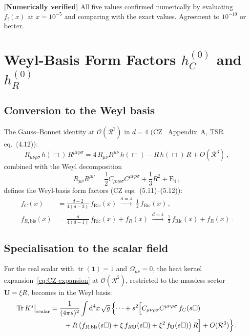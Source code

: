 \documentclass[11pt,a4paper]{article}
\newcommand{\Id}{\mathbf{1}}
\newcommand{\Tr}{\operatorname{Tr}}
\newcommand{\tr}{\operatorname{tr}}
\newcommand{\Ricsq}{R_{\mu\nu}R^{\mu\nu}}
\newcommand{\Weylsq}{C_{\mu\nu\rho\sigma}C^{\mu\nu\rho\sigma}}
\newcommand{\dd}{\mathrm{d}}
\theoremstyle{definition}
\theoremstyle{remark}
\newcommand{\verified}[1]{%
  \par\noindent\colorbox{green!10}{%
    \parbox{\dimexpr\linewidth-2\fboxsep}{%
      \textcolor{green!50!black}{\textbf{[Numerically verified]}}
      \textcolor{green!50!black}{#1}%
    }%
  }\par%
}
\begin{document}
\verified{All five values confirmed numerically by evaluating
$f_i(x)$ at $x = 10^{-5}$ and comparing with the exact values.
Agreement to $10^{-10}$ or better.}


\section{Weyl-Basis Form Factors $h_C^{(0)}$ and $h_R^{(0)}$}
\label{sec:weyl}

\subsection{Conversion to the Weyl basis}

The Gauss--Bonnet identity at $\mathcal{O}(\mathcal{R}^2)$ in $d=4$
(CZ~\cite{CZ2012} Appendix~A, TSR~\cite{TSR2020} eq.~(4.12)):
\begin{equation}
  R_{\mu\nu\rho\sigma}\,h(\Box)\,R^{\mu\nu\rho\sigma}
  = 4\,\Ricsq\,h(\Box) - R\,h(\Box)\,R + O(\mathcal{R}^3)\,,
  \label{eq:GB}
\end{equation}
combined with the Weyl decomposition
\begin{equation}
  \Ricsq = \frac{1}{2}\Weylsq + \frac{1}{3}R^2 + \text{E}_4\,,
  \label{eq:weyl-decomp}
\end{equation}
defines the Weyl-basis form factors (CZ eqs.~(5.11)--(5.12)):
\begin{align}
  f_C(x) &= \frac{d-2}{4(d-3)}\,f_{\text{Ric}}(x)
    \;\xrightarrow{d=4}\;
    \frac{1}{2}\,f_{\text{Ric}}(x)\,,
  \label{eq:fC}\\[4pt]
  f_{R,\text{bis}}(x) &= \frac{d}{4(d-1)}\,f_{\text{Ric}}(x) + f_R(x)
    \;\xrightarrow{d=4}\;
    \frac{1}{3}\,f_{\text{Ric}}(x) + f_R(x)\,.
  \label{eq:fRbis}
\end{align}


\subsection{Specialisation to the scalar field}

For the real scalar with $\tr(\Id) = 1$ and $\Omega_{\mu\nu} = 0$,
the heat kernel expansion~\eqref{eq:CZ-expansion} at
$\mathcal{O}(\mathcal{R}^2)$, restricted to the massless sector
$\mathbf{U} = \xi R$, becomes in the Weyl basis:
\begin{align}
  \Tr K^s\big|_{\text{scalar}}
  &= \frac{1}{(4\pi s)^2}\int \dd^4 x\,\sqrt{g}\,\Bigl\{
    \cdots
  + s^2\Bigl[
    \Weylsq\,f_C(s\Box)
  \nonumber\\
  &\qquad
    + R\,\bigl(f_{R,\text{bis}}(s\Box)
    + \xi\,f_{R\mathbf{U}}(s\Box)
    + \xi^2\,f_{\mathbf{U}}(s\Box)\bigr)\,R
  \Bigr] + O(\mathcal{R}^3)\Bigr\}\,.
  \label{eq:scalar-HK-weyl}
\end{align}
\end{document}
